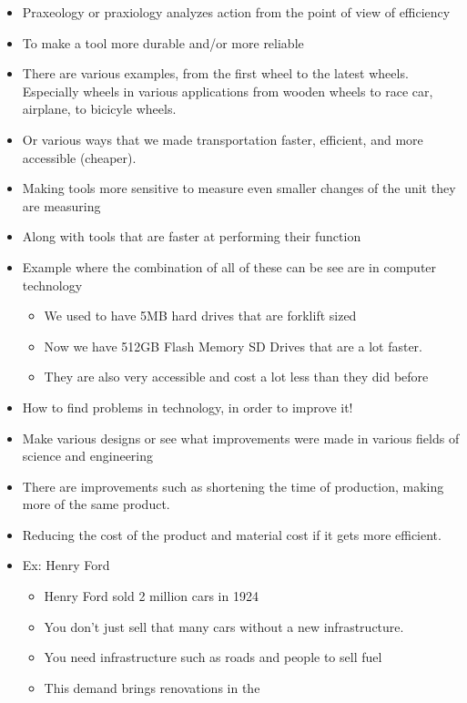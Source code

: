 \documentclass{article}
\begin{document}
\begin{itemize}
  \item Praxeology or praxiology analyzes action from the point of view
    of efficiency
  \item To make a tool more durable and/or more
    reliable
  \item There are various examples, from the first wheel
    to the latest wheels. Especially wheels
    in various applications from wooden wheels
    to race car, airplane, to bicicyle wheels.
  \item Or various ways that we made transportation
    faster, efficient, and more accessible (cheaper).
  \item Making tools more sensitive to measure even smaller
    changes of the unit they are measuring
  \item Along with tools that are faster at performing their
    function
  \item Example where the combination of all of these
    can be see are in computer technology
    \begin{itemize}
      \item We used to have 5MB hard drives that are forklift
        sized
      \item Now we have 512GB Flash Memory SD Drives that are
        a lot faster.
      \item They are also very accessible and cost a lot less
        than they did before
    \end{itemize}
  \item How to find problems in technology, in order to
    improve it!
  \item Make various designs or see what improvements were
    made in various fields of science and engineering
  \item There are improvements such as shortening
    the time of production, making more of the same product.
  \item Reducing the cost of the product and material cost
    if it gets more efficient.
  \item Ex: Henry Ford
    \begin{itemize}
      \item Henry Ford sold 2 million cars in 1924
      \item You don't just sell that many cars without a new
        infrastructure.
      \item You need infrastructure such as roads
        and people to sell fuel
      \item This demand brings renovations in the

\end{itemize}
\end{itemize}
\end{document}
